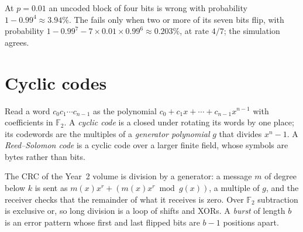 \label{lst:b3:information-and-codes:hamming}

\label{out:b3:information-and-codes:hamming}

At $p = 0.01$ an uncoded block of four bits is wrong with probability $1 - 0.99^4 \approx 3.94\%$. The  fails only when two or more of its seven bits flip, with probability $1 - 0.99^7 - 7 \times 0.01 \times 0.99^6 \approx 0.203\%$, at rate $4/7$; the simulation agrees.

\section{Cyclic codes}\label{sec:b3:information-and-codes:cyclic}

\begin{definition}\label{def:b3:information-and-codes:cyclic}
Read a word $c_0 c_1 \cdots c_{n-1}$ as the polynomial $c_0 + c_1 x + \cdots + c_{n-1} x^{n-1}$ with coefficients in $\mathbb{F}_2$. A \emph{cyclic code} is a  closed under rotating its words by one place; its codewords are the multiples of a \emph{generator polynomial} $g$ that divides $x^n - 1$. A \emph{Reed--Solomon code} is a cyclic code over a larger finite field, whose symbols are bytes rather than bits.
\end{definition}

The CRC of the Year~2 volume is division by a generator: a message $m$ of degree below $k$ is sent as $m(x) x^r + (m(x) x^r \bmod g(x))$, a multiple of $g$, and the receiver checks that the remainder of what it receives is zero. Over $\mathbb{F}_2$ subtraction is exclusive or, so long division is a loop of shifts and XORs. A \emph{burst} of length $b$ is an error pattern whose first and last flipped bits are $b - 1$ positions apart.

\label{lst:b3:information-and-codes:crc}

